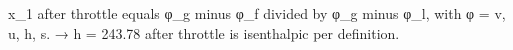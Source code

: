 x_1 after throttle equals φ_g minus φ_f divided by φ_g minus φ_l, with φ = v, u, h, s.  
→ h = 243.78 after throttle is isenthalpic per definition.
